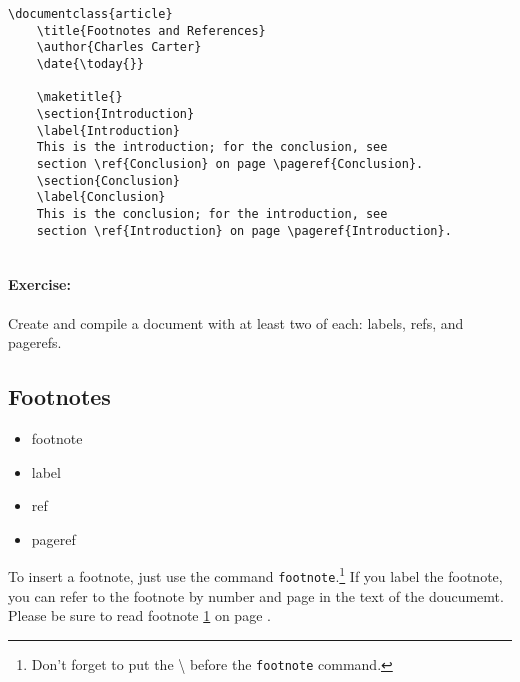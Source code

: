         \begin{verbatim}
\documentclass{article}
    \title{Footnotes and References}
    \author{Charles Carter}
    \date{\today{}}
 
    \maketitle{}
    \section{Introduction}
    \label{Introduction}
    This is the introduction; for the conclusion, see 
    section \ref{Conclusion} on page \pageref{Conclusion}.
    \section{Conclusion}
    \label{Conclusion}
    This is the conclusion; for the introduction, see 
    section \ref{Introduction} on page \pageref{Introduction}.
    

        \end{verbatim}

        \paragraph{Exercise:} Create and compile a document with at least two of each: labels, refs, and pagerefs.

    \subsection{Footnotes}
    \label{Footnotes}

        \begin{cmd}
            \begin{itemize}
                \item{footnote}
                \item{label}
                \item{ref}
                \item{pageref}
            \end{itemize}
        \end{cmd}

    To insert a footnote, just use the command \texttt{footnote}.\footnote{\label{references:fn}Don't forget to put the \textbackslash{} before the \texttt{footnote} command.} If you label the footnote, you can refer to the footnote by number and page in the text of the doucumemt. Please be sure to read footnote \ref{references:fn} on page \pageref{references:fn}.

